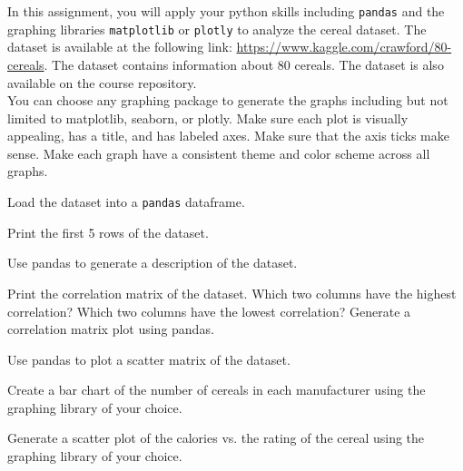\documentclass{homework}
\begin{document}
\maketitle

In this assignment, you will apply your python skills including \texttt{pandas} and the graphing libraries \texttt{matplotlib} or \texttt{plotly} to analyze the cereal dataset. The dataset is available at the following link: \url{https://www.kaggle.com/crawford/80-cereals}. The dataset contains information about 80 cereals. The dataset is also available on the course repository.\\

You can choose any graphing package to generate the graphs including but not limited to matplotlib, seaborn, or plotly. Make sure each plot is visually appealing, has a title, and has labeled axes. Make sure that the axis ticks make sense. Make each graph have a consistent theme and color scheme across all graphs.\\

\begin{problem}[1]
    Load the dataset into a \texttt{pandas} dataframe.
\end{problem}

\begin{problem}[2]
    Print the first 5 rows of the dataset.
\end{problem}

\begin{problem}[3]
    Use pandas to generate a description of the dataset. 
\end{problem}

\begin{problem}[4]
    Print the correlation matrix of the dataset. Which two columns have the highest correlation? Which two columns have the lowest correlation? Generate a correlation matrix plot using pandas. 
\end{problem}

\begin{problem}[5]
    Use pandas to plot a scatter matrix of the dataset. 
\end{problem}

\begin{problem}[6]
    Create a bar chart of the number of cereals in each manufacturer using the graphing library of your choice.
\end{problem}

\begin{problem}[7]
    Generate a scatter plot of the calories vs. the rating of the cereal using the graphing library of your choice.
\end{problem}
\end{document}
